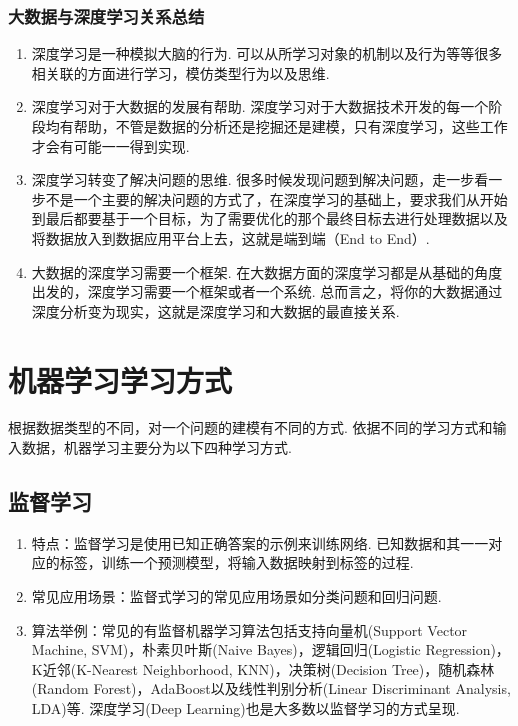 \subsubsection{大数据与深度学习关系总结}
\begin{enumerate}
\item 深度学习是一种模拟大脑的行为.
可以从所学习对象的机制以及行为等等很多相关联的方面进行学习，模仿类型行为以及思维.
\item 深度学习对于大数据的发展有帮助.
深度学习对于大数据技术开发的每一个阶段均有帮助，不管是数据的分析还是挖掘还是建模，只有深度学习，这些工作才会有可能一一得到实现.
\item 深度学习转变了解决问题的思维.
很多时候发现问题到解决问题，走一步看一步不是一个主要的解决问题的方式了，在深度学习的基础上，要求我们从开始到最后都要基于一个目标，为了需要优化的那个最终目标去进行处理数据以及将数据放入到数据应用平台上去，这就是端到端（End to End）.
\item 大数据的深度学习需要一个框架.
在大数据方面的深度学习都是从基础的角度出发的，深度学习需要一个框架或者一个系统.
总而言之，将你的大数据通过深度分析变为现实，这就是深度学习和大数据的最直接关系.
\end{enumerate}

\section{机器学习学习方式}
\label{ux673aux5668ux5b66ux4e60ux5b66ux4e60ux65b9ux5f0f}
根据数据类型的不同，对一个问题的建模有不同的方式.
依据不同的学习方式和输入数据，机器学习主要分为以下四种学习方式.
\subsection{ 监督学习}
\label{ux76d1ux7763ux5b66ux4e60}
\begin{enumerate}
\item  特点：监督学习是使用已知正确答案的示例来训练网络.
已知数据和其一一对应的标签，训练一个预测模型，将输入数据映射到标签的过程.
\item  常见应用场景：监督式学习的常见应用场景如分类问题和回归问题.
\item 算法举例：常见的有监督机器学习算法包括支持向量机(Support Vector Machine, SVM)，朴素贝叶斯(Naive Bayes)，逻辑回归(Logistic Regression)，K近邻(K-Nearest Neighborhood, KNN)，决策树(Decision Tree)，随机森林(Random Forest)，AdaBoost以及线性判别分析(Linear Discriminant Analysis, LDA)等.
深度学习(Deep Learning)也是大多数以监督学习的方式呈现.
\end{enumerate}
